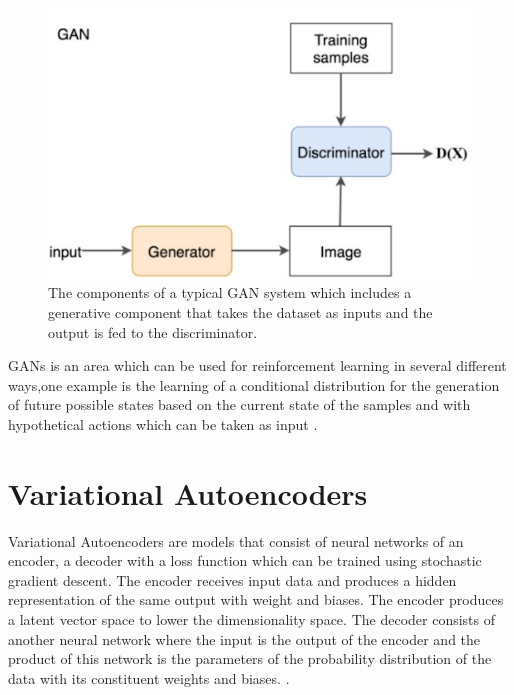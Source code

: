 \begin{figure}
  \centering
  \includegraphics[width=1\linewidth]{graphics/generational_models/GAN.png}
  \caption{The components of a typical GAN system which includes a generative component that takes the dataset as inputs and the output is fed to the discriminator.  }
  \label{fig:GAN}
\end{figure}
\pagebreak
GANs is an area which can be used  for reinforcement learning in several different ways,one example is the learning of a conditional distribution for the generation of future possible states based on the current state of the samples and with hypothetical actions which can be taken as input \citet{goodfellow:2016}.


\section{Variational Autoencoders}

Variational Autoencoders are models that consist of neural networks of an encoder, a decoder with a loss function which can be trained using stochastic gradient descent. The encoder receives input data and produces a hidden representation of the same output with weight and biases. The encoder produces a latent vector space to lower the dimensionality space.
The decoder consists of another neural network where the input is the output of the encoder and the product of this network is the parameters of the probability distribution of the data with its constituent weights and biases. \citet{doersch:2016}.

